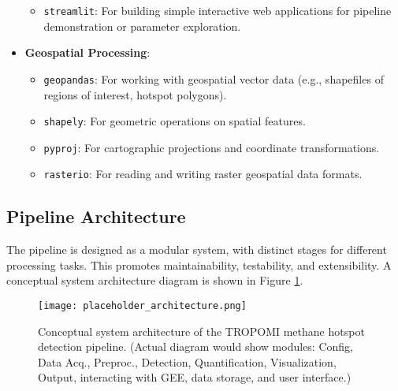 \documentclass[12pt,a4paper]{article}
\begin{document}
\begin{itemize}
\begin{itemize}
        \item \texttt{streamlit}: For building simple interactive web applications for pipeline demonstration or parameter exploration.
    \end{itemize}
    \item \textbf{Geospatial Processing}:
    \begin{itemize}
        \item \texttt{geopandas}: For working with geospatial vector data (e.g., shapefiles of regions of interest, hotspot polygons).
        \item \texttt{shapely}: For geometric operations on spatial features.
        \item \texttt{pyproj}: For cartographic projections and coordinate transformations.
        \item \texttt{rasterio}: For reading and writing raster geospatial data formats.
    \end{itemize}
\end{itemize}

\subsection{Pipeline Architecture}
The pipeline is designed as a modular system, with distinct stages for different processing tasks. This promotes maintainability, testability, and extensibility. A conceptual system architecture diagram is shown in Figure \ref{fig:architecture}.

\begin{figure}[H]
    \centering
    \texttt{[image: placeholder\_architecture.png]} %
    \caption{Conceptual system architecture of the TROPOMI methane hotspot detection pipeline. (Actual diagram would show modules: Config, Data Acq., Preproc., Detection, Quantification, Visualization, Output, interacting with GEE, data storage, and user interface.)}
    \label{fig:architecture}
\end{figure}
\end{document}
